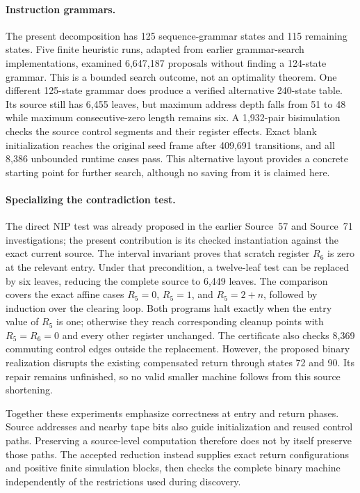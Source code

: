 \paragraph{Instruction grammars.}
The present decomposition has 125 sequence-grammar states and 115 remaining
states.  Five finite heuristic runs, adapted from earlier grammar-search
implementations, examined 6,647,187 proposals without finding a 124-state
grammar.  This is a bounded search outcome, not an optimality theorem.
One different 125-state grammar does produce a verified alternative
240-state table.  Its source still has 6,455 leaves, but maximum address
depth falls from 51 to 48 while maximum consecutive-zero length remains
six.  A 1,932-pair bisimulation checks the source control segments and their
register effects.  Exact blank initialization reaches the original seed
frame after 409,691 transitions, and all 8,386 unbounded runtime cases pass.
This alternative layout provides a concrete starting point for further
search, although no saving from it is claimed here.

\paragraph{Specializing the contradiction test.}
The direct NIP test was already proposed in the earlier Source~57 and
Source~71 investigations; the present contribution is its checked
instantiation against the exact current source.  The interval invariant
proves that scratch register $R_6$ is zero at the relevant entry.  Under
that precondition, a twelve-leaf test can be replaced by six leaves,
reducing the complete source to 6,449 leaves.  The comparison covers the
exact affine cases $R_5=0$, $R_5=1$, and $R_5=2+n$, followed by induction
over the clearing loop.  Both programs halt exactly when the entry value
of $R_5$ is one; otherwise they reach corresponding cleanup points with
$R_5=R_6=0$ and every other register unchanged.  The certificate also checks
8,369 commuting control edges outside the replacement.  However, the
proposed binary realization disrupts the existing compensated return
through states 72 and 90.  Its repair remains unfinished, so no valid
smaller machine follows from this source shortening.

Together these experiments emphasize correctness at entry and return
phases.  Source addresses and nearby tape bits also guide initialization
and reused control paths.  Preserving a source-level computation therefore
does not by itself preserve those paths.  The accepted reduction instead
supplies exact return configurations and positive finite simulation blocks,
then checks the complete binary machine independently of the restrictions
used during discovery.
